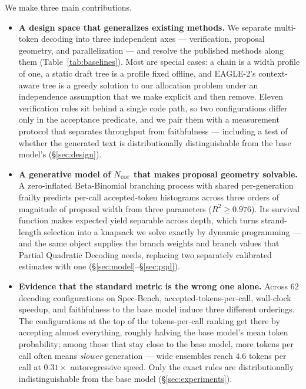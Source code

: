 \documentclass{article} %
\makeatletter
\newenvironment{ai}
  {\color{lightgray}%
   \@ifpackageloaded{caption}{\captionsetup{font={color=lightgray}}}{}%
   \let\ai@savedfloatreset\@floatboxreset
   \g@addto@macro\@floatboxreset{\color{lightgray}}}
  {\global\let\@floatboxreset\ai@savedfloatreset}
\makeatother
\begin{document}
\begin{ai}
We make three main contributions.

\begin{itemize}
  \item \textbf{A design space that generalizes existing methods.} We separate
  multi-token decoding into three independent axes --- verification, proposal
  geometry, and parallelization --- and resolve the published methods along them
  (Table~\ref{tab:baselines}). Most are special cases: a chain is a width profile
  of one, a static draft tree is a profile fixed offline, and EAGLE-2's
  context-aware tree is a greedy solution to our allocation problem under an
  independence assumption that we make explicit and then remove. Eleven
  verification rules sit behind a single code path, so two configurations differ
  only in the acceptance predicate, and we pair them with a measurement protocol
  that separates throughput from faithfulness --- including a test of whether the
  generated text is distributionally distinguishable from the base model's
  (\S\ref{sec:design}).

  \item \textbf{A generative model of $N_{\mathrm{cor}}$ that makes proposal geometry
  solvable.} A zero-inflated Beta-Binomial branching process with shared
  per-generation frailty predicts per-call accepted-token histograms across three
  orders of magnitude of proposal width from three parameters
  ($R^2 \geq 0.976$). Its survival function makes expected yield separable across
  depth, which turns strand-length selection into a knapsack we solve exactly by
  dynamic programming --- and the same object supplies the branch weights and
  branch values that Partial Quadratic Decoding needs, replacing two separately
  calibrated estimates with one (\S\ref{sec:model}--\S\ref{sec:pqd}).

  \item \textbf{Evidence that the standard metric is the wrong one alone.}
  Across $62$ decoding configurations on Spec-Bench, accepted-tokens-per-call,
  wall-clock speedup, and faithfulness to the base model induce three different
  orderings. The configurations at the top of the tokens-per-call ranking get
  there by accepting almost everything, roughly halving the base model's mean
  token probability; among those that stay close to the base model, more tokens
  per call often means \emph{slower} generation --- wide ensembles reach $4.6$
  tokens per call at $0.31\times$ autoregressive speed. Only the exact rules are
  distributionally indistinguishable from the base model
  (\S\ref{sec:experiments}).
\end{itemize}


\end{ai}
\end{document}
